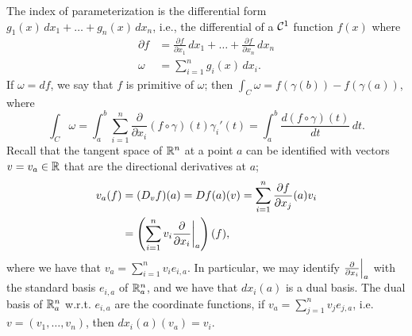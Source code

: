 \begin{enumerate}[label=(\roman*)]
    The index of parameterization is the differential form $g_1(x) \, dx_1 + \dots + g_n(x) \, dx_n$, i.e., the differential of a $\mathcal C^1$ function $f(x)$ where
    \begin{align*}
        \partial f &= \frac{\partial f}{\partial x_1} \, dx_1 + \dots + \frac{\partial f}{\partial x_n} \, dx_n \\
        \omega &= \sum_{i=1}^n g_i(x) \, dx_i.
    \end{align*}
    If $\omega = df$, we say that $f$ is primitive of $\omega$; then $\int_C \omega = f(\gamma(b)) - f(\gamma(a))$, where
    \[ \int_C \omega = \int_a^b \sum_{i=1}^n \frac{\partial}{\partial x_i} (f \circ \gamma)(t) \gamma_i'(t) = \int_a^b \frac{d(f \circ \gamma)(t)}{dt} \, dt. \]
    Recall that the tangent space of $\mathbb R^n$ at a point $a$ can be identified with vectors $v = v_a \in \mathbb R$ that are the directional derivatives at $a$;
    \begin{align*}
        v_a(f) &= (D_v f)(a) = Df(a)(v) = \sum_{i=1}^n \frac{\partial f}{\partial x_j}(a) v_i \\
        &= \left(\sum_{i=1}^n v_i \restr{\frac{\partial}{\partial x_i}}{a}\right) (f),
    \end{align*}
    where we have that $v_a = \sum_{i=1}^n v_i e_{i,a}$. In particular, we may identify $\restr{\frac{\partial}{\partial x_i}}{a}$ with the standard basis $e_{i,a}$ of $\mathbb R^n_a$, and we have that $dx_i(a)$ is a dual basis. The dual basis of $\mathbb R^n_a$ w.r.t. $e_{i,a}$ are the coordinate functions, if $v_a = \sum_{j=1}^n v_j e_{j,a}$, i.e. $v = (v_1, \dots, v_n)$, then $dx_i(a)(v_a) = v_i$.
\end{enumerate}